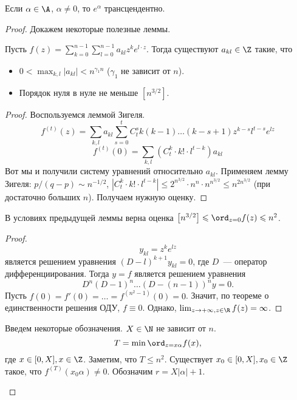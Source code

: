 \begin{theorem}[Линдеман]
  Если $\alpha \in \A$, $\alpha \ne 0$, то $e^{\alpha}$ трансцендентно.
\end{theorem}
\begin{proof}
  Докажем некоторые полезные леммы.
  \begin{lemma}
    Пусть $f(z) = \sum_{k=0}^{n-1} \sum_{l=0}^{n-1} a_{kl} z^k e^{l \cdot z}$.
    Тогда существуют $a_{kl} \in \Z$ такие, что
    \begin{itemize}
      \item $0 < \max_{k,l} |a_{kl}| < n^{\gamma_1 n}$ ($\gamma_1$ не зависит от $n$).
      \item Порядок нуля в нуле не меньше $\left[ n^{3/2} \right]$.
    \end{itemize}
  \end{lemma}
  \begin{proof}
    Воспользуемся леммой Зигеля.
    $$
      f^{(t)}(z) = \sum_{k, l} a_{kl} \sum_{s=0}^t C_t^s k(k-1) \ldots (k - s + 1) z^{k-s} l^{t-s} e^{lz}
    $$
    $$
      f^{(t)}(0) = \sum_{k, l} \left(C_t^k \cdot k! \cdot l^{t-k}\right) a_{kl}
    $$
    Вот мы и получили систему уравнений относительно $a_{kl}$. Применяем лемму Зигеля: $p / (q - p) \sim n^{-1/2}$, $\left| C_t^k \cdot k! \cdot l^{t-k}\right| \leqslant 2^{n^{3/2}} \cdot n^n \cdot n^{n^{3/2}} \leqslant n^{2n^{3/2}}$ (при достаточно больших $n$). Получаем нужную оценку.
  \end{proof}
  \begin{lemma}
    В условиях предыдущей леммы верна оценка $\left[ n^{3/2} \right] \leqslant \ord_{z=0} f(z) \leqslant n^2$.
  \end{lemma}
  \begin{proof}
    $$
      y_{kl} = z^k e^{lz}
    $$
    является решением уравнения $(D - l)^{k+1} y_{kl} = 0$, где $D$~--- оператор дифференциирования. Тогда $y = f$ является решением уравнения
    $$
      D^n (D - 1)^n \ldots (D - (n - 1))^n y = 0.
    $$
    Пусть $f(0) = f'(0) = \ldots = f^{(n^2 - 1)}(0) = 0$. Значит, по теореме о единственности решения ОДУ, $f \equiv 0$. Однако, $\lim_{z \to +\infty, z \in \R} f(z) = \infty$.
  \end{proof}
  Введем некоторые обозначения. $X \in \N$ не зависит от $n$.
  $$
    T = \min \ord_{z = x \alpha} f(x),
  $$
  где $x \in [0, X], x \in \Z$.
  Заметим, что $T \leqslant n^2$. Существует $x_0 \in [0, X], x_0 \in \Z$ такое, что $f^{(T)}(x_0 \alpha) \ne 0$. Обозначим $r = X |\alpha| + 1$.
  \begin{lemma}

\end{lemma}
\end{proof}
